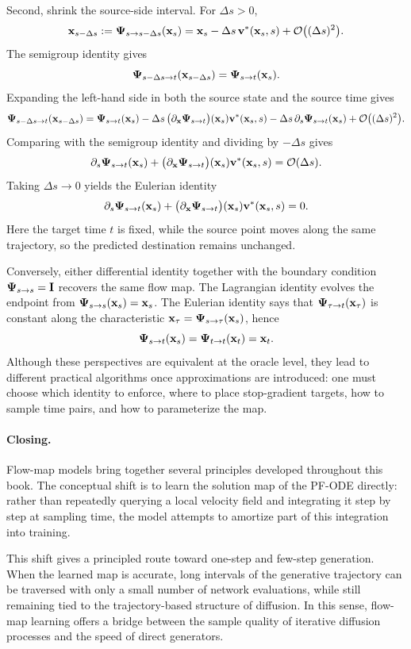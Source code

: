 Second, shrink the source-side interval.  For $\Delta s>0$,
\[
    {\mathbf{x}}_{s-\Delta s}
    :=
    {\bm{\Psi}}_{s\to s-\Delta s}({\mathbf{x}}_s)
    =
    {\mathbf{x}}_s-\Delta s\,{\mathbf{v}}^*({\mathbf{x}}_s,s)
    +\mathcal{O}\big((\Delta s)^2\big).
\]
The semigroup identity gives
\[
    {\bm{\Psi}}_{s-\Delta s\to t}({\mathbf{x}}_{s-\Delta s})
    =
    {\bm{\Psi}}_{s\to t}({\mathbf{x}}_s).
\]
Expanding the left-hand side in both the source state and the source time gives
\[
    {\bm{\Psi}}_{s-\Delta s\to t}({\mathbf{x}}_{s-\Delta s})
    =
    {\bm{\Psi}}_{s\to t}({\mathbf{x}}_s)
    -
    \Delta s\,
    \big(\partial_{{\mathbf{x}}}{\bm{\Psi}}_{s\to t}\big)({\mathbf{x}}_s){\mathbf{v}}^*({\mathbf{x}}_s,s)
    -
    \Delta s\,
    \partial_s{\bm{\Psi}}_{s\to t}({\mathbf{x}}_s)
    +
    \mathcal{O}\big((\Delta s)^2\big).
\]
Comparing with the semigroup identity and dividing by $-\Delta s$ gives
\[
    \partial_s{\bm{\Psi}}_{s\to t}({\mathbf{x}}_s)
    +
    \big(\partial_{{\mathbf{x}}}{\bm{\Psi}}_{s\to t}\big)({\mathbf{x}}_s){\mathbf{v}}^*({\mathbf{x}}_s,s)
    =
    \mathcal{O}(\Delta s).
\]
Taking $\Delta s\to0$ yields the Eulerian identity
\[
    \partial_s{\bm{\Psi}}_{s\to t}({\mathbf{x}}_s)
    +
    \big(\partial_{{\mathbf{x}}}{\bm{\Psi}}_{s\to t}\big)({\mathbf{x}}_s){\mathbf{v}}^*({\mathbf{x}}_s,s)
    =
    0.
\]
Here the target time $t$ is fixed, while the source point moves along the same
trajectory, so the predicted destination remains unchanged.

Conversely, either differential identity
together with the boundary condition ${\bm{\Psi}}_{s\to s}={\mathbf{I}}$ recovers the same
flow map.  The Lagrangian identity evolves the endpoint from
${\bm{\Psi}}_{s\to s}({\mathbf{x}}_s)={\mathbf{x}}_s$.  The Eulerian identity says that
${\bm{\Psi}}_{\tau\to t}({\mathbf{x}}_\tau)$ is constant along the characteristic
${\mathbf{x}}_\tau={\bm{\Psi}}_{s\to \tau}({\mathbf{x}}_s)$, hence
\[
    {\bm{\Psi}}_{s\to t}({\mathbf{x}}_s)
    =
    {\bm{\Psi}}_{t\to t}({\mathbf{x}}_t)
    =
    {\mathbf{x}}_t.
\]
Although these perspectives are equivalent at the oracle level, they lead to
different practical algorithms once approximations are introduced: one must
choose which identity to enforce, where to place stop-gradient targets, how to
sample time pairs, and how to parameterize the map.


\paragraph{Closing.}
Flow-map models bring together several principles developed throughout this
book.  The conceptual shift is to
learn the solution map of the PF-ODE directly: rather than repeatedly querying a
local velocity field and integrating it step by step at sampling time, the model
attempts to amortize part of this integration into training.

This shift gives a principled route toward one-step and few-step generation.
When the learned map is accurate, long intervals of the generative trajectory can
be traversed with only a small number of network evaluations, while still
remaining tied to the trajectory-based structure of diffusion.  In this sense,
flow-map learning offers a bridge between the sample quality of iterative
diffusion processes and the speed of direct generators.

